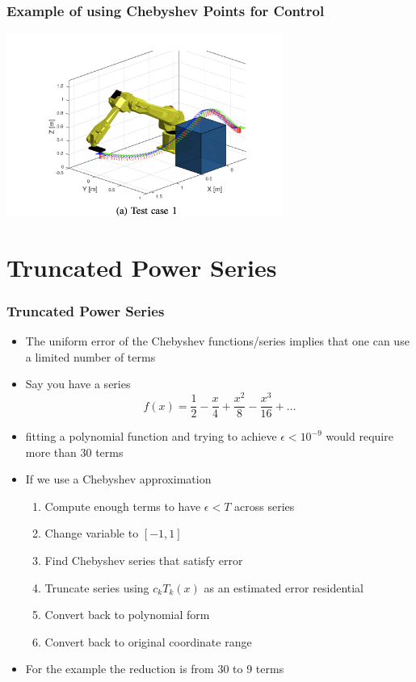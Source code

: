 \documentclass[10pt]{beamer}
\begin{document}
\begin{frame}
  \frametitle{Example of using Chebyshev Points for Control}
  \centerline{\includegraphics[height=6cm]{Chebyshev-points}}
\end{frame}

\section{Truncated Power Series}

\begin{frame}
  \frametitle{Truncated Power Series}
  \begin{itemize}
  \item The uniform error of the Chebyshev functions/series implies
    that one can use a limited number of terms
  \item Say you have a series
    \[
      f(x) = \frac{1}{2} - \frac{x}{4} + \frac{x^2}{8} - \frac{x^3}{16} + \ldots
    \]
  \item fitting a polynomial function and trying to achieve
    $\epsilon < 10^{-9}$ would require more than 30 terms
  \item If we use a Chebyshev approximation
    \begin{enumerate}
    \item Compute enough terms to have $\epsilon < T$ across series
    \item Change variable to $[-1,1]$
    \item Find Chebyshev series that satisfy error
    \item Truncate series using $c_kT_k(x)$ as an estimated error residential
    \item Convert back to polynomial form
    \item Convert back to original coordinate range
    \end{enumerate}
  \item For the example the reduction is from 30 to 9 terms
  \end{itemize}
\end{frame}
\end{document}

